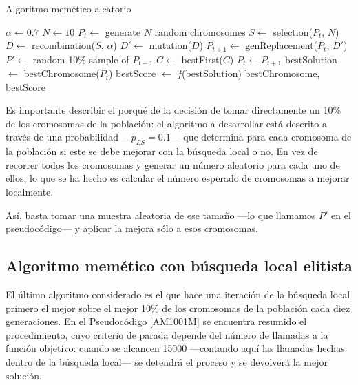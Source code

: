 \documentclass[a4paper, 11pt, titlepage]{article}
\begin{document}
    \begin{algorithm}
        \caption{Algoritmo memético aleatorio}\label{AM1001}
        \begin{algorithmic}[1]
            \State $\alpha \gets 0.7$ 
            \State $N \gets 10$ 
            \State $P_t \gets$ generate $N$ random chromosomes
                \State $S \gets$ selection($P_t$, $N$) 
                \State $D \gets$ recombination($S$, $\alpha$)
                \State $D' \gets$ mutation($D$)
                \State $P_{t+1} \gets$ genReplacement($P_t$, $D'$)
                    \State $P' \gets$ random 10\% sample of $P_{t+1}$
                    \State $C \gets$ bestFirst($C$)
                    \EndFor
                \EndIf
                \State $P_t \gets P_{t+1}$
            \EndWhile
            \State bestSolution $\gets$ bestChromosome($P_t$)
            \State bestScore $\gets$ $f$(bestSolution)
            \State \Return bestChromosome, bestScore
            \EndFunction
        \end{algorithmic}
    \end{algorithm}

    Es importante describir el porqué de la decisión de tomar directamente un 10\% de los cromosomas de la población: el algoritmo a desarrollar está descrito a través de una probabilidad ---$p_{LS} = 0.1$--- que determina para cada cromosoma de la población si este se debe mejorar con la búsqueda local o no. En vez de recorrer todos los cromosomas y generar un número aleatorio para cada uno de ellos, lo que se ha hecho es calcular el número esperado de cromosomas a mejorar localmente.

    Así, basta tomar una muestra aleatoria de ese tamaño ---lo que llamamos $P'$ en el pseudocódigo--- y aplicar la mejora sólo a esos cromosomas.

    \subsection{Algoritmo memético con búsqueda local elitista}
    El último algoritmo considerado es el que hace una iteración de la búsqueda local primero el mejor sobre el mejor 10\% de los cromosomas de la población cada diez generaciones. En el Pseudocódigo \ref{AM1001M} se encuentra resumido el procedimiento, cuyo criterio de parada depende del número de llamadas a la función objetivo: cuando se alcancen 15000 ---contando aquí las llamadas hechas dentro de la búsqueda local--- se detendrá el proceso y se devolverá la mejor solución.
\end{document}
